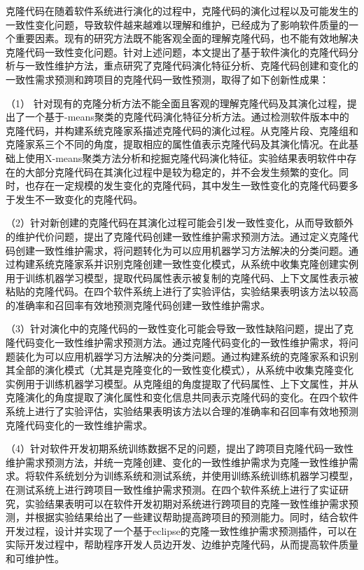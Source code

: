 

克隆代码在随着软件系统进行演化的过程中，克隆代码的演化过程以及可能发生的一致性变化问题，导致软件越来越难以理解和维护，已经成为了影响软件质量的一个重要因素。现有的研究方法既不能客观全面的理解克隆代码，也不能有效地解决克隆代码一致性变化问题。针对上述问题，本文提出了基于软件演化的克隆代码分析与一致性维护方法，重点研究了克隆代码演化特征分析、克隆代码创建和变化的一致性需求预测和跨项目的克隆代码一致性预测，取得了如下创新性成果：

（1） 针对现有的克隆分析方法不能全面且客观的理解克隆代码及其演化过程，提出了一个基于-means聚类的克隆代码演化特征分析方法。通过检测软件版本中的克隆代码，并构建系统克隆家系描述克隆代码的演化过程。从克隆片段、克隆组和克隆家系三个不同的角度，提取相应的属性值表示克隆代码及其演化情况。在此基础上使用X-means聚类方法分析和挖掘克隆代码演化特征。实验结果表明软件中存在的大部分克隆代码在其演化过程中是较为稳定的，并不会发生频繁的变化。同时，也存在一定规模的发生变化的克隆代码，其中发生一致性变化的克隆代码要多于发生不一致变化的克隆代码。

（2）针对新创建的克隆代码在其演化过程可能会引发一致性变化，从而导致额外的维护代价问题，提出了克隆代码创建一致性维护需求预测方法。通过定义克隆代码创建一致性维护需求，将问题转化为可以应用机器学习方法解决的分类问题。通过构建系统克隆家系并识别克隆创建一致性变化模式，从系统中收集克隆创建实例用于训练机器学习模型，提取代码属性表示被复制的克隆代码、上下文属性表示被粘贴的克隆代码。在四个软件系统上进行了实验评估，实验结果表明该方法以较高的准确率和召回率有效地预测克隆代码创建一致性维护需求。

（3）针对演化中的克隆代码的一致性变化可能会导致一致性缺陷问题，提出了克隆代码变化一致性维护需求预测方法。通过克隆代码变化的一致性维护需求，将问题装化为可以应用机器学习方法解决的分类问题。通过构建系统的克隆家系和识别其全部的演化模式（尤其是克隆变化的一致性变化模式），从系统中收集克隆变化实例用于训练机器学习模型。从克隆组的角度提取了代码属性、上下文属性，并从克隆演化的角度提取了演化属性和变化信息共同表示克隆代码的变化。在四个软件系统上进行了实验评估，实验结果表明该方法以合理的准确率和召回率有效地预测克隆代码变化的一致性维护需求。

（4）针对软件开发初期系统训练数据不足的问题，提出了跨项目克隆代码一致性维护需求预测方法，并统一克隆创建、变化的一致性维护需求为克隆一致性维护需求。将软件系统划分为训练系统和测试系统，并使用训练系统训练机器学习模型，在测试系统上进行跨项目一致性维护需求预测。在四个软件系统上进行了实证研究，实验结果表明可以在软件开发初期对系统进行跨项目的克隆一致性维护需求预测，并根据实验结果给出了一些建议帮助提高跨项目的预测能力。同时，结合软件开发过程，设计并实现了一个基于eclipse的克隆一致性维护需求预测插件，可以在实际开发过程中，帮助程序开发人员边开发、边维护克隆代码，从而提高软件质量和可维护性。

